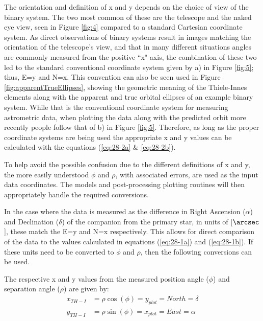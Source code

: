 \documentclass[12pt,preprint]{aastex}
\begin{document}
The orientation and definition of x and y depends on the choice of view of the binary system.  The two most common of these are the telescope and the naked eye view, seen in Figure \ref{fig:4} compared to a standard Cartesian coordinate system.  As direct observations of binary systems result in images matching the orientation of the telescope's view, and that in many different situations angles are commonly measured from the positive ``x" axis, the combination of these two led to the standard conventional coordinate system given by a) in Figure \ref{fig:5}; thus, E=y and N=x.  This convention can also be seen used in Figure \ref{fig:apparentTrueEllipses}, showing the geometric meaning of the Thiele-Innes elements along with the apparent and true orbital ellipses of an example binary system.  While that is the conventional coordinate system for measuring astrometric data, when plotting the data along with the predicted orbit more recently people follow that of b) in Figure \ref{fig:5}.  Therefore, as long as the proper coordinate systems are being used the appropriate x and y values can be calculated with the equations (\ref{eq:28-2a} \& \ref{eq:28-2b}).

To help avoid the possible confusion due to the different definitions of x and y, the more easily understood $\phi$ and $\rho$, with associated errors, are used as the input data coordinates.  The models and post-processing plotting routines will then appropriately handle the required conversions.

In the case where the data is measured as the difference in Right Ascension ($\alpha$) and Declination ($\delta$) of the companion from the primary star, in units of [$\arcsec$], these match the E=y and N=x respectively.  This allows for direct comparison of the data to the values calculated in equations  (\ref{eq:28-1a}) and (\ref{eq:28-1b}).  If these units need to be converted to $\phi$ and $\rho$, then the following conversions can be used.

The respective x and y values from the measured position angle ($\phi$) and separation angle ($\rho$) are given by:
\begin{subequations}
\begin{align}\label{eq:28-2a}
x_{TH-I}& = \rho \cos(\phi) = y_{plot} = North = \delta\\
\label{eq:28-2b}
y_{TH-I}& = \rho \sin(\phi) = x_{plot} = East = \alpha
\end{align}
\end{subequations}
\end{document}
